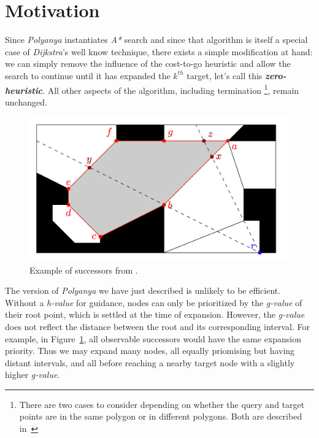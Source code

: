 \section{Motivation}\label{mot}
Since \textit{Polyanya} instantiates \textit{A*} search and since that algorithm is itself a
special case of \textit{Dijkstra}'s well know technique, there exists a simple modification at
hand: we can simply remove the influence of the cost-to-go heuristic and allow the search to
continue until it has expanded the $k^{th}$ target, let's call this \textbf{\textit{zero-heuristic}}.
All other aspects of the algorithm, including termination
\footnote{There are two cases to consider depending on whether the query and target points are in the same polygon or in different polygons.
Both are described in~\cite{cuicompromise}}, remain unchanged.

\begin{figure}[ht]
    \centering
    \includegraphics[width=.6\linewidth]{pic/suc.png}
    \caption{\small Example of successors from \cite{cuicompromise}.}
    \label{suc2}
\end{figure}

The version of \textit{Polyanya} we have just described is unlikely to be efficient. Without a
\textit{h-value} for guidance, nodes can only be prioritized by the \textit{g-value} of their
root point, which is settled at the time of expansion. However, the \textit{g-value} does not
reflect the distance between the root and its corresponding interval. For example, in
Figure~\ref{suc2}, all observable successors would have the same expansion priority. Thus we
may expand many nodes, all equally priomising but having distant intervals, and all before
reaching a nearby target node with a slightly higher \textit{g-value}.

